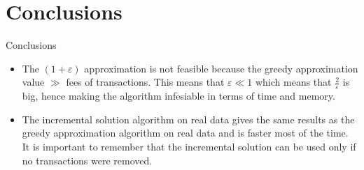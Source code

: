 \documentclass{beamer}
\begin{document}
\section {Conclusions}
\begin{frame}{Conclusions}
    \begin{itemize}
        \item {The $(1+\varepsilon)$ approximation is not feasible because the greedy approximation value $\gg$ fees of transactions. This means that $\varepsilon \ll 1$ which means that $\frac{2}{\varepsilon}$ is big, hence making the algorithm infesiable in terms of time and memory.}
        \item {The incremental solution algorithm on real data gives the same results as the greedy approximation algorithm on real data and is faster most of the time. It is important to remember that the incremental solution can be used only if no transactions were removed.}
    \end{itemize}
\end{frame}
\end{document}
